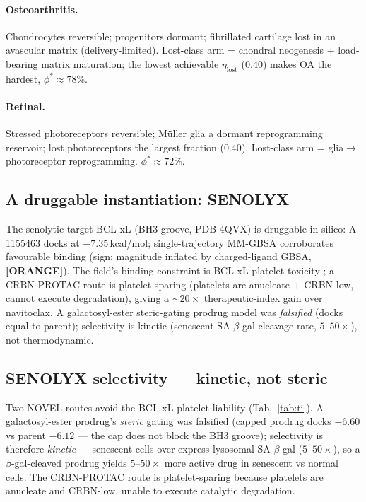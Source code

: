 \documentclass[11pt,a4paper]{article}
\newcommand{\tierbadge}[2]{\textcolor{#1}{\textbf{[#2]}}}
\providecommand{\tierOrange}{\tierbadge{orange!80!black}{ORANGE}}
\begin{document}
\paragraph{Osteoarthritis.} Chondrocytes reversible; progenitors dormant; fibrillated cartilage
lost in an avascular matrix (delivery-limited). Lost-class arm = chondral neogenesis +
load-bearing matrix maturation; the lowest achievable $\eta_{\text{lost}}$ ($0.40$) makes OA
the hardest, $\phi^\ast\!\approx\!78\%$.
\paragraph{Retinal.} Stressed photoreceptors reversible; M\"uller glia a dormant reprogramming
reservoir; lost photoreceptors the largest fraction ($0.40$). Lost-class arm = glia$\to$photoreceptor
reprogramming. $\phi^\ast\!\approx\!72\%$.

\subsection{A druggable instantiation: SENOLYX}
The senolytic target BCL-xL (BH3 groove, PDB 4QVX) is druggable in silico: A-1155463 docks
at $-7.35$\,kcal/mol; single-trajectory MM-GBSA corroborates favourable binding (sign;
magnitude inflated by charged-ligand GBSA, \tierOrange). The field's binding constraint is
BCL-xL platelet toxicity \citep{he2020}; a CRBN-PROTAC route is platelet-sparing (platelets
are anucleate + CRBN-low, cannot execute degradation), giving a ${\sim}20\times$
therapeutic-index gain over navitoclax. A galactosyl-ester steric-gating prodrug model was
\emph{falsified} (docks equal to parent); selectivity is kinetic (senescent SA-$\beta$-gal
cleavage rate, $5$--$50\times$), not thermodynamic.

\subsection{SENOLYX selectivity — kinetic, not steric}
\label{sec:selectivity}
Two NOVEL routes avoid the BCL-xL platelet liability (Tab.~\ref{tab:ti}). A galactosyl-ester
prodrug's \emph{steric} gating was falsified (capped prodrug docks $-6.60$ vs parent $-6.12$
--- the cap does not block the BH3 groove); selectivity is therefore \emph{kinetic} ---
senescent cells over-express lysosomal SA-$\beta$-gal ($5$--$50\times$), so a $\beta$-gal-cleaved
prodrug yields $5$--$50\times$ more active drug in senescent vs normal cells. The CRBN-PROTAC
route is platelet-sparing because platelets are anucleate and CRBN-low, unable to execute
catalytic degradation.
\end{document}
